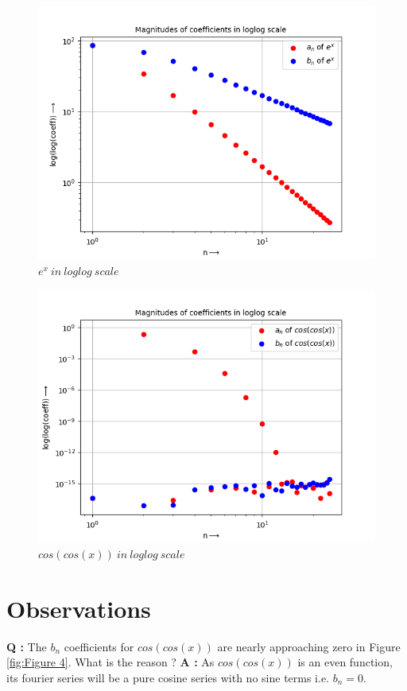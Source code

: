 \documentclass[11pt, a4paper]{article}
\begin{document}
\begin{figure}[!tbh]
    \centering
    \includegraphics[scale = 0.7]{Q3-3.png}
    \caption{$e^x\ in\ loglog\ scale$}
    \label{fig:Figure 5}
\end{figure}

\begin{figure}[!tbh]
    \centering
    \includegraphics[scale = 0.7]{Q3-4.png}
    \caption{$cos(cos(x))\ in\ loglog\ scale$}
    \label{fig:Figure 6}
\end{figure}


\newpage
\section{Observations}
\textbf{Q :} The $b_n$ coefficients for $cos(cos(x))$ are nearly approaching zero in Figure \ref{fig:Figure 4}. What is the reason ?\newline
\textbf{A :} As $cos(cos(x))$ is an even function, its fourier series will be a pure cosine series with no sine terms i.e. $b_n=0$. \newline \newline
\end{document}
